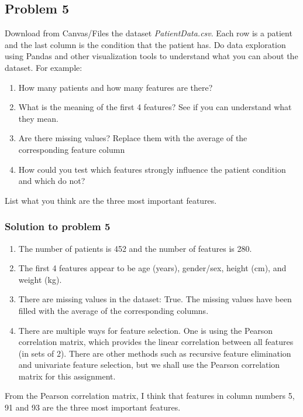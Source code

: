 \documentclass[12pt]{article}%
\begin{document}
\subsection{Problem 5}

Download from Canvas/Files the dataset \emph{PatientData.csv}. Each row is a patient and the last column is the condition that the patient has. Do data exploration using Pandas and other visualization tools to understand what you can about the dataset. For example:
\begin{enumerate}
    \item How many patients and how many features are there?
    \item What is the meaning of the first 4 features? See if you can understand what they mean.
    \item Are there missing values? Replace them with the average of the corresponding feature column
    \item How could you test which features strongly influence the patient condition and which do not? 
\end{enumerate}

List what you think are the three most important features.

\subsubsection{Solution to problem 5}

\begin{enumerate}
    \item The number of patients is 452 and the number of features is 280.
    \item The first 4 features appear to be age (years), gender/sex, height (cm), and weight (kg).
    \item There are missing values in the dataset: True. The missing values have been filled with the average of the corresponding columns.
    \item There are multiple ways for feature selection. One is using the Pearson correlation matrix, which provides the linear correlation between all features (in sets of 2). There are other methods such as recursive feature elimination and univariate feature selection, but we shall use the Pearson correlation matrix for this assignment.
\end{enumerate} 

From the Pearson correlation matrix, I think that features in column numbers 5, 91 and 93 are the three most important features.
\end{document}
